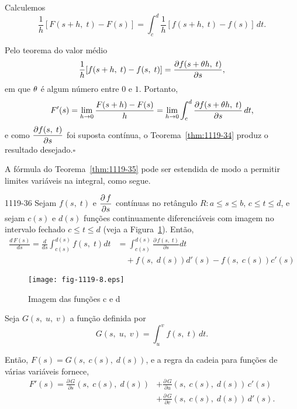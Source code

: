 \prova Calculemos
\begin{equation*}
  \frac{1}{h}[F(s+h,\; t)-F(s)]=\int_c^d\frac{1}{h}[f(s+h,\; t)-f(s)]\,dt.
\end{equation*}

Pelo teorema do valor médio
\begin{equation*}
  \frac{1}{h}[f(s+h,\; t)-f(s,\; t)]=\frac{\partial f(s+\theta h,\; t)}{\partial s},
\end{equation*}
em que $\theta$ é algum número entre $0$ e $1$. Portanto,
\begin{equation*}
F'(s) = \lim_{h\to 0}\dfrac{F(s + h) - F(s)}{h} = 
\lim_{h \to 0}\int_c^d\dfrac{\partial f (s+\theta h,\; t)}{\partial s}\,dt,
\end{equation*}
e como $\displaystyle{\frac{\partial f(s,\; t)}{\partial s} }$ foi suposta
contínua, o Teorema~\ref{thm:1119-34} produz o resultado
desejado.\hfill $\square$

A fórmula do Teorema~\ref{thm:1119-35} pode ser estendida de modo a
permitir limites variáveis na integral, como segue.

\begin{theoc}{}{1119-36}
Sejam $f(s,\; t)$ e $\displaystyle{\frac{\partial\, f}{\partial s}} $
contínuas no retângulo $R\colon a \leq s \leq b$, $c \leq t \leq
d$, e sejam $c(s)$ e $d(s)$ funções continuamente diferenciáveis
com imagem no intervalo fechado $c \leq t \leq d$ (veja a
Figura~\ref{fig-1119-8}). Então,
\begin{align*}
  \frac{d\, F(s)}{ds}=\frac{d}{ds}\int_{c(s)}^{d(s)}f(s,\; t)dt&=\int_{c(s)}^{d(s)}
  \frac{\partial\, f(s,\; t)}{\partial s}dt \\[2ex]
   &\quad+f(s,\; d(s))d'(s)-f(s,\; c(s))c'(s)
\end{align*}
\end{theoc}

\begin{figure}[H]
\centering
\texttt{[image: fig-1119-8.eps]}
\caption{Imagem das funções c e d}
\label{fig-1119-8}
\end{figure}

\prova Seja $G (s,\; u,\; v)$ a função definida por
 \begin{equation*}
  G(s,\; u,\;  v)=\int^v_u f(s,\; t)\, dt.
 \end{equation*}

Então, $F(s) = G (s,\; c(s),\; d(s))$, e a regra da cadeia para
funções de várias variáveis fornece,
\begin{align}
 F'(s)=\frac{\partial\, G}{\partial s}(s,\; c(s),\; d(s))&+\frac{\partial\, G}
 {\partial u}(s,\;c(s),\; d(s))\, c'(s)\nonumber  \\[2ex]
   &+\frac{\partial\, G}{\partial v}(s,\;c(s),\; d(s))\, d'(s).\label{1119-21}
\end{align}

